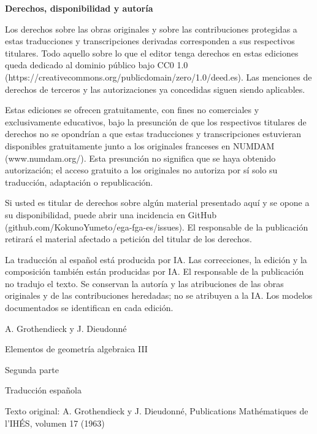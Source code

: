 \documentclass[10pt,oneside]{book}
\begin{document}
\begingroup
\small
\noindent\textbf{Derechos, disponibilidad y autoría}

Los derechos sobre las obras originales y sobre las contribuciones protegidas a estas traducciones y transcripciones derivadas corresponden a sus respectivos titulares. Todo aquello sobre lo que el editor tenga derechos en estas ediciones queda dedicado al dominio público bajo CC0 1.0 (https://creativecommons.org/publicdomain/zero/1.0/deed.es). Las menciones de derechos de terceros y las autorizaciones ya concedidas siguen siendo aplicables.

Estas ediciones se ofrecen gratuitamente, con fines no comerciales y exclusivamente educativos, bajo la presunción de que los respectivos titulares de derechos no se opondrían a que estas traducciones y transcripciones estuvieran disponibles gratuitamente junto a los originales franceses en NUMDAM (www.numdam.org/). Esta presunción no significa que se haya obtenido autorización; el acceso gratuito a los originales no autoriza por sí solo su traducción, adaptación o republicación.

Si usted es titular de derechos sobre algún material presentado aquí y se opone a su disponibilidad, puede abrir una incidencia en GitHub (github.com/KokunoYumeto/ega-fga-es/issues). El responsable de la publicación retirará el material afectado a petición del titular de los derechos.

La traducción al español está producida por IA. Las correcciones, la edición y la composición también están producidas por IA. El responsable de la publicación no tradujo el texto. Se conservan la autoría y las atribuciones de las obras originales y de las contribuciones heredadas; no se atribuyen a la IA. Los modelos documentados se identifican en cada edición.
\par
\endgroup
\clearpage

\begin{titlepage}
  \centering
  {\Large A. Grothendieck y J. Dieudonné\par}
  \vfill
  {\Huge Elementos de geometría algebraica III\par}
  \vspace{1.5ex}
  {\LARGE Segunda parte\par}
  \vfill
  {\large Traducción española\par}
  \vspace{1ex}
  {\small Texto original: A. Grothendieck y J. Dieudonné, Publications Mathématiques de l’IHÉS, volumen 17 (1963)\par}
\end{titlepage}
\end{document}
